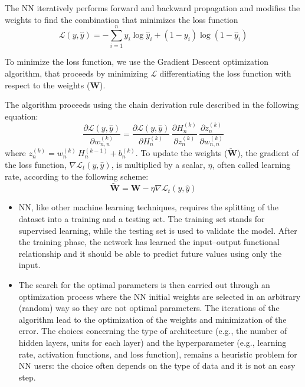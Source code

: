 \documentclass[12pt]{beamer}
\begin{document}
\begin{frame}
	\scriptsize
The NN iteratively performs forward and backward propagation and modifies the weights to find the combination that minimizes the loss function	$$\mathcal{L}(y,\hat{y})=-\sum_{i=1}^{n} y_{i} \log \hat{y}_{i}+\left(1-y_{i}\right) \log \left(1-\hat{y}_{i}\right)$$

To minimize the loss function, we use the Gradient Descent optimization algorithm, that proceeds by minimizing $\mathcal{L}$ differentiating the loss function with respect to the weights  ($\mathbf{{W}}$).

The algorithm proceeds using the chain derivation rule described in the following equation:
\begin{equation}
	\frac{\partial \mathcal{L}(y,\hat{y})}{\partial w_{n,n}^{(k)}} =\frac{\partial \mathcal{L}(y,\hat{y})}{\partial H_n^{(k)}}\,\frac{{\partial H_n^{(k)}}}{\partial z_n^{(k)}} \, \frac{\partial z_n^{(k)}}{\partial w_{n,n}^{(k)}}
\end{equation}
where $ z_n^{(k)}=w_{n}^{(k)}\,H_{n}^{(k-1)}+b_n^{(k)}$. 
To update the weights ($\mathbf{\tilde{W}}$), the gradient of the loss function, $\nabla \mathcal{L}_t(y,\hat{y})$, is multiplied by a scalar, $\eta$, often called learning rate, according to the following scheme:
	\begin{equation}
	\mathbf{\tilde{W}}=\mathbf{W}-\eta \nabla \mathcal{L}_t(y,\hat{y})
\end{equation}
\end{frame}

\begin{frame}
	\scriptsize
	\begin{itemize}
	\item 	NN, like other machine learning techniques, requires the splitting of the dataset into a training and a testing set. The training set stands for supervised learning, while the testing set is used to
	validate the model. After the training phase, the network has learned the input–output functional relationship and it should be able to predict future values using only the input.
	\item The search for the optimal parameters is then carried out through an optimization process where the NN initial weights are selected in an arbitrary (random) way so they are not optimal parameters. The iterations of the algorithm lead to the optimization of the weights and minimization of the error. 
	The choices concerning the type of architecture (e.g., the number of hidden layers, units for each layer) and the hyperparameter (e.g., learning rate, activation functions, and loss function), remains a heuristic problem for NN users: the choice often depends on the type of data and it is not an easy step. 

	\end{itemize}
\end{frame}
\end{document}
